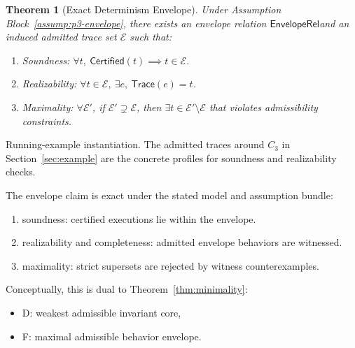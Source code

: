 \documentclass[a4paper,10pt,twocolumn,english]{article}
\numberwithin{equation}{section}
\theoremstyle{paperdef}
\theoremstyle{paperplain}
\newtheorem{theorem}[definition]{Theorem}
\theoremstyle{paperdef}
\theoremstyle{paperremark}
\theoremstyle{paperdef}
\newcommand{\EnvelopeRel}{\ensuremath{\mathsf{EnvelopeRel}}}
\begin{document}
\begin{theorem}[Exact Determinism Envelope]
	\label{thm:envelope}
	Under Assumption Block~\ref{assump:p3-envelope}, there exists an envelope relation \EnvelopeRel and an induced admitted trace set $\mathcal{E}$ such that:
	\begin{enumerate}
		\item Soundness: $\forall t,\ \mathsf{Certified}(t) \implies t \in \mathcal{E}$.
		\item Realizability: $\forall t \in \mathcal{E},\ \exists e,\ \mathsf{Trace}(e) = t$.
		\item Maximality: $\forall \mathcal{E}'$, if $\mathcal{E}' \supsetneq \mathcal{E}$, then $\exists t \in \mathcal{E}' \setminus \mathcal{E}$ that violates admissibility constraints.
	\end{enumerate}
\end{theorem}

Running-example instantiation. The admitted traces around $C_3$ in
Section~\ref{sec:example} are the concrete profiles for soundness and
realizability checks.

The envelope claim is exact under the stated model and assumption bundle:
\begin{enumerate}
	\item soundness: certified executions lie within the envelope.
	\item realizability and completeness: admitted envelope behaviors are witnessed.
	\item maximality: strict supersets are rejected by witness counterexamples.
\end{enumerate}

Conceptually, this is dual to Theorem~\ref{thm:minimality}:
\begin{itemize}
	\item D: weakest admissible invariant core,
	\item F: maximal admissible behavior envelope.
\end{itemize}
\end{document}
